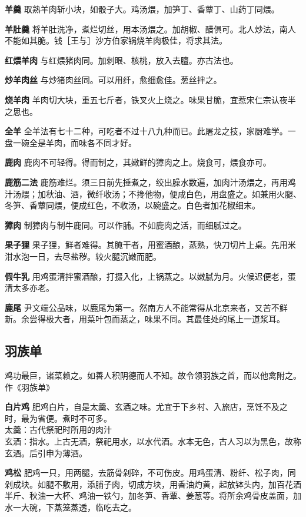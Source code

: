 \documentclass[]{article}
\begin{document}
\textbf{羊羹}
取熟羊肉斩小块，如骰子大。鸡汤煨，加笋丁、香蕈丁、山药丁同煨。

\textbf{羊肚羹}
将羊肚洗净，煮烂切丝，用本汤煨之。加胡椒、醋俱可。北人炒法，南人不能如其脆。钱［王与］沙方伯家锅烧羊肉极佳，将求其法。

\textbf{红煨羊肉} 与红煨猪肉同。加刺眼、核桃，放入去膻。亦古法也。

\textbf{炒羊肉丝} 与炒猪肉丝同。可以用纤，愈细愈佳。葱丝拌之。

\textbf{烧羊肉}
羊肉切大块，重五七斤者，铁叉火上烧之。味果甘脆，宜惹宋仁宗认夜半之思也。

\textbf{全羊}
全羊法有七十二种，可吃者不过十八九种而已。此屠龙之技，家厨难学。一盘一碗全是羊肉，而味各不同才好。

\textbf{鹿肉}
鹿肉不可轻得。得而制之，其嫩鲜的獐肉之上。烧食可，煨食亦可。

\textbf{鹿筋二法}
鹿筋难烂。须三日前先捶煮之，绞出臊水数遍，加肉汁汤煨之，再用鸡汁汤煨；加秋油、酒，微纤收汤；不搀他物，便成白色，用盘盛之。如兼用火腿、冬笋、香蕈同煨，便成红色，不收汤，以碗盛之。白色者加花椒细末。

\textbf{獐肉} 制獐肉与制牛鹿同。可以作脯。不如鹿肉之活，而细腻过之。

\textbf{果子狸}
果子狸，鲜者难得。其腌干者，用蜜酒酿，蒸熟，快刀切片上桌。先用米泔水泡一日，去尽盐秽。较火腿沉嫩而肥。

\textbf{假牛乳}
用鸡蛋清拌蜜酒酿，打掇入化，上锅蒸之。以嫩腻为月。火候迟便老，蛋清太多亦老。

\textbf{鹿尾}
尹文端公品味，以鹿尾为第一。然南方人不能常得从北京来者，又苦不鲜新。余尝得极大者，用菜叶包而蒸之，味果不同。其最佳处的尾上一道浆耳。

\hypertarget{header-n21}{%
\subsection{羽族单}\label{header-n21}}

鸡功最巨，诸菜赖之。如善人积阴德而人不知。故令领羽族之首，而以他禽附之。作《羽族单》

\textbf{白片鸡}
肥鸡白片，自是太羹、玄酒之味。尤宜于下乡村、入旅店，烹饪不及之时，最为省便。煮时不可多。\\
太羹：古代祭祀时所用的肉汁\\
玄酒：指水。上古无酒，祭祀用水，以水代酒。水本无色，古人习以为黑色，故称玄酒。后引申为薄酒。

\textbf{鸡松}
肥鸡一只，用两腿，去筋骨剁碎，不可伤皮。用鸡蛋清、粉纤、松子肉，同剁成块。如腿不敷用，添脯子肉，切成方块，用香油灼黄，起放钵头内，加百花酒半斤、秋油一大杯、鸡油一铁勺，加冬笋、香覃、姜葱等。将所余鸡骨皮盖面，加水一大碗，下蒸笼蒸透，临吃去之。
\end{document}
